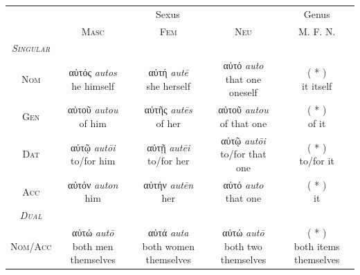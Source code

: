 \documentclass[10pt,a4paper,notitlepage]{article}
\newcommand{\tsc}[1]{\textsc{#1}}
\newcommand*{\grc}[1]{\fontspec{Inter}#1\rmfamily}
\newcommand{\trc}[1]{\textit{\fontspec{Tinos}#1}}
\begin{document}
    \begin{table}[H]
        \begin{tabular}{c|ccc|c}
            & \multicolumn{3}{c|}{Sexus} & Genus \\
            & \tsc{Masc} & \tsc{Fem} & \tsc{Neu} & \tsc{M. F. N.} \\
            \hline
            \emph{\tsc{Singular}} & & & & \\
            \tsc{Nom} & \makecell{\grc{αὐτός} \trc{autos} \\ \small he himself} & \makecell{\grc{αὐτή} \trc{autē} \\ \small she herself} & \makecell{\grc{αὐτό} \trc{auto} \\ \small that one oneself} & \makecell{( * ) \\ \small it itself} \\
            \tsc{Gen} & \makecell{\grc{αὐτοῦ} \trc{autou} \\ \small of him} & \makecell{\grc{αὐτῆς} \trc{autēs} \\ \small of her} & \makecell{\grc{αὐτοῦ} \trc{autou} \\ \small of that one} & \makecell{( * ) \\ \small of it} \\
            \tsc{Dat} & \makecell{\grc{αὐτῷ} \trc{autōi} \\ \small to/for him} & \makecell{\grc{αὐτῇ} \trc{autēi} \\ \small to/for her} & \makecell{\grc{αὐτῷ} \trc{autōi} \\ \small to/for that one} & \makecell{( * ) \\ \small to/for it} \\
            \tsc{Acc} & \makecell{\grc{αὐτόν} \trc{auton} \\ \small him} & \makecell{\grc{αὐτήν} \trc{autēn} \\ \small her} & \makecell{\grc{αὐτό} \trc{auto} \\ \small that one} & \makecell{( * ) \\ \small it} \\
            \hline
            \emph{\tsc{Dual}} & & & & \\
            \tsc{Nom/Acc} & \makecell{\grc{αὐτώ} \trc{autō} \\ \small both men themselves} & \makecell{\grc{αὐτά} \trc{auta} \\ \small both women themselves} & \makecell{\grc{αὐτώ} \trc{autō} \\ \small both two themselves} & \makecell{( * ) \\ \small both items themselves} \\

\end{tabular}
\end{table}
\end{document}

